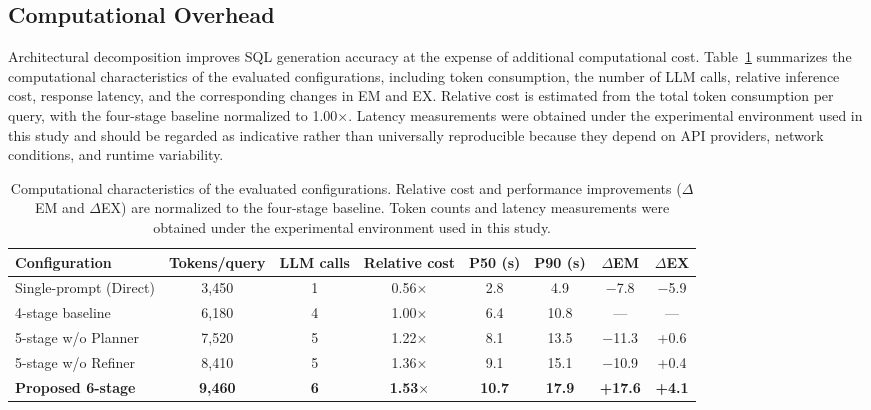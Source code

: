 \documentclass{svproc}
\begin{document}

\subsection{Computational Overhead}
\label{subsec:cost}

Architectural decomposition improves SQL generation accuracy at the expense of additional computational cost. Table~\ref{tab:cost} summarizes the computational characteristics of the evaluated configurations, including token consumption, the number of LLM calls, relative inference cost, response latency, and the corresponding changes in EM and EX. Relative cost is estimated from the total token consumption per query, with the four-stage baseline normalized to 1.00$\times$. Latency measurements were obtained under the experimental environment used in this study and should be regarded as indicative rather than universally reproducible because they depend on API providers, network conditions, and runtime variability.

\begin{table}[t]
\caption{Computational characteristics of the evaluated configurations. Relative cost and performance improvements ($\Delta$EM and $\Delta$EX) are normalized to the four-stage baseline. Token counts and latency measurements were obtained under the experimental environment used in this study.}
\label{tab:cost}
\centering
\scriptsize
\begin{tabular*}{\textwidth}{@{\extracolsep{\fill}}lccccccc@{}}
\toprule
\textbf{Configuration} &
\textbf{Tokens/query} &
\textbf{LLM calls} &
\textbf{Relative cost} &
\textbf{P50 (s)} &
\textbf{P90 (s)} &
\textbf{$\Delta$EM} &
\textbf{$\Delta$EX} \\
\midrule
Single-prompt (Direct) & 3,450 & 1 & 0.56$\times$ & 2.8 & 4.9 & $-$7.8 & $-$5.9 \\
4-stage baseline       & 6,180 & 4 & 1.00$\times$ & 6.4 & 10.8 & --- & --- \\
5-stage w/o Planner    & 7,520 & 5 & 1.22$\times$ & 8.1 & 13.5 & $-$11.3 & +0.6 \\
5-stage w/o Refiner    & 8,410 & 5 & 1.36$\times$ & 9.1 & 15.1 & $-$10.9 & +0.4 \\
\textbf{Proposed 6-stage} &
\textbf{9,460} &
\textbf{6} &
\textbf{1.53$\times$} &
\textbf{10.7} &
\textbf{17.9} &
\textbf{+17.6} &
\textbf{+4.1} \\
\bottomrule
\end{tabular*}
\end{table}
\end{document}
